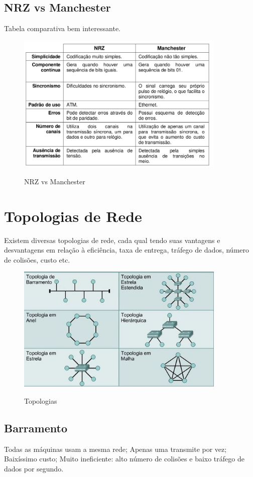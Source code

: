 \documentclass{article}
\begin{document}
\subsection{NRZ vs Manchester}

Tabela comparativa bem interessante.

\begin{figure}[h]
    \center
    \includegraphics[width=10cm]{imagens/nrzmanchester.png}
    \label{nrzmanchester}
    \caption{NRZ vs Manchester}
\end{figure}

\section{Topologias de Rede}

Existem diversas topologias de rede, cada qual tendo suas vantagens e
desvantagens em relação à eficiência, taxa de entrega, tráfego de dados, número
de colisões, custo etc.

\begin{figure}[h]
    \center
    \includegraphics[width=10cm]{imagens/topologias.jpg}
    \label{topologias}
    \caption{Topologias}
\end{figure}

\subsection{Barramento}
Todas as máquinas usam a mesma rede; Apenas uma transmite por vez; Baixíssimo
custo; Muito ineficiente: alto número de colisões e baixo tráfego de dados por
segundo.
\end{document}
